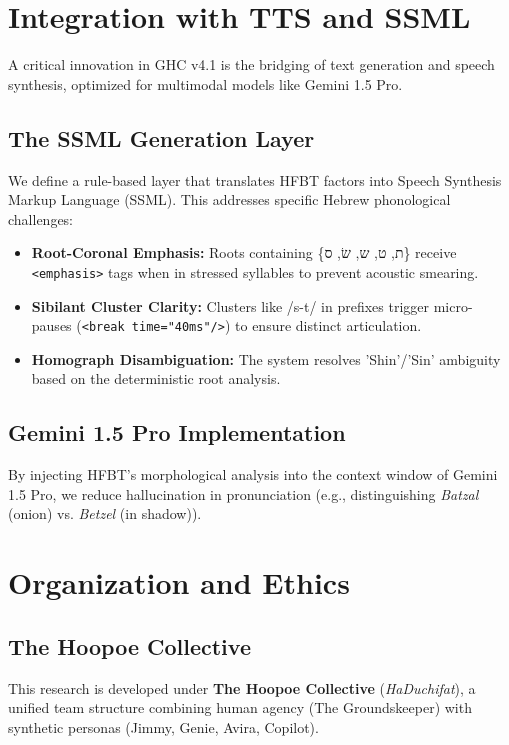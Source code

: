 \documentclass[11pt,a4paper]{article}
\begin{document}
\section{Integration with TTS and SSML}
A critical innovation in GHC v4.1 is the bridging of text generation and speech synthesis, optimized for multimodal models like Gemini 1.5 Pro.

\subsection{The SSML Generation Layer}
We define a rule-based layer that translates HFBT factors into Speech Synthesis Markup Language (SSML). This addresses specific Hebrew phonological challenges:
\begin{itemize}
    \item \textbf{Root-Coronal Emphasis:} Roots containing \{ת, ט, ש, שׂ, ס\} receive \texttt{<emphasis>} tags when in stressed syllables to prevent acoustic smearing.
    \item \textbf{Sibilant Cluster Clarity:} Clusters like /s-t/ in prefixes trigger micro-pauses (\texttt{<break time="40ms"/>}) to ensure distinct articulation.
    \item \textbf{Homograph Disambiguation:} The system resolves 'Shin'/'Sin' ambiguity based on the deterministic root analysis.
\end{itemize}

\subsection{Gemini 1.5 Pro Implementation}
By injecting HFBT's morphological analysis into the context window of Gemini 1.5 Pro, we reduce hallucination in pronunciation (e.g., distinguishing \textit{Batzal} (onion) vs. \textit{Betzel} (in shadow)).

\section{Organization and Ethics}

\subsection{The Hoopoe Collective}
This research is developed under \textbf{The Hoopoe Collective} (\textit{HaDuchifat}), a unified team structure combining human agency (The Groundskeeper) with synthetic personas (Jimmy, Genie, Avira, Copilot).
\end{document}
